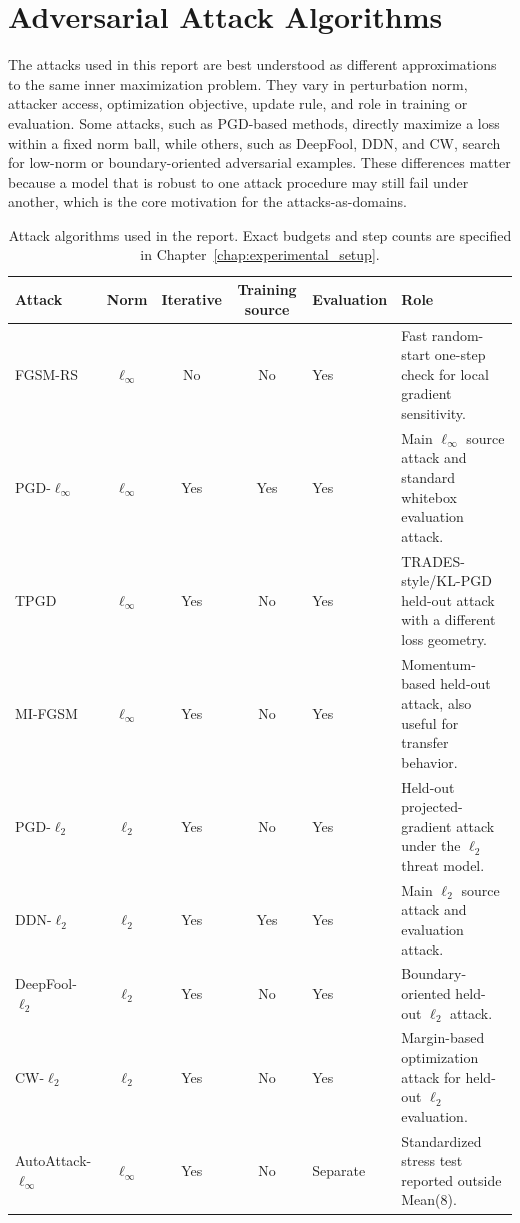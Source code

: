 \section{Adversarial Attack Algorithms}

The attacks used in this report are best understood as different approximations
to the same inner maximization problem. They vary in perturbation norm, attacker
access, optimization objective, update rule, and role in training or evaluation.
Some attacks, such as PGD-based methods, directly maximize a loss within a fixed
norm ball, while others, such as DeepFool, DDN, and CW, search for low-norm or
boundary-oriented adversarial examples. These differences matter because a model
that is robust to one attack procedure may still fail under another, which is the
core motivation for the attacks-as-domains.

\begin{table}[H]
\centering
\caption[Attack algorithm overview]{Attack algorithms used in the report. Exact budgets and step counts are specified in Chapter~\ref{chap:experimental_setup}.}
\label{tab:ch2_attack_summary}
\small
\setlength{\tabcolsep}{3pt}
\begin{tabularx}{\linewidth}{@{}lcccl>{\raggedright\arraybackslash}X@{}}
\toprule
Attack & Norm & Iterative & Training source & Evaluation & Role \\
\midrule
FGSM-RS & $\ell_\infty$ & No & No & Yes &
Fast random-start one-step check for local gradient sensitivity. \\
PGD-$\ell_\infty$ & $\ell_\infty$ & Yes & Yes & Yes &
Main $\ell_\infty$ source attack and standard whitebox evaluation attack. \\
TPGD & $\ell_\infty$ & Yes & No & Yes &
TRADES-style/KL-PGD held-out attack with a different loss geometry. \\
MI-FGSM & $\ell_\infty$ & Yes & No & Yes &
Momentum-based held-out attack, also useful for transfer behavior. \\
PGD-$\ell_2$ & $\ell_2$ & Yes & No & Yes &
Held-out projected-gradient attack under the $\ell_2$ threat model. \\
DDN-$\ell_2$ & $\ell_2$ & Yes & Yes & Yes &
Main $\ell_2$ source attack and evaluation attack. \\
DeepFool-$\ell_2$ & $\ell_2$ & Yes & No & Yes &
Boundary-oriented held-out $\ell_2$ attack. \\
CW-$\ell_2$ & $\ell_2$ & Yes & No & Yes &
Margin-based optimization attack for held-out $\ell_2$ evaluation. \\
AutoAttack-$\ell_\infty$ & $\ell_\infty$ & Yes & No & Separate &
Standardized stress test reported outside Mean(8). \\
\bottomrule
\end{tabularx}
\end{table}
